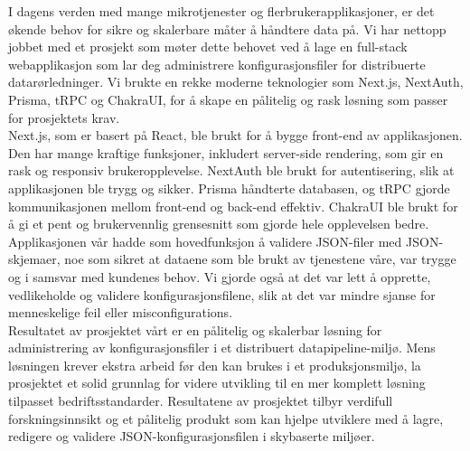 
\noindent
I dagens verden med mange mikrotjenester og flerbrukerapplikasjoner, er det økende behov for sikre og skalerbare måter å håndtere data på. Vi har nettopp jobbet med et prosjekt som møter dette behovet ved å lage en full-stack webapplikasjon som lar deg administrere konfigurasjonsfiler for distribuerte datarørledninger. Vi brukte en rekke moderne teknologier som Next.js, NextAuth, Prisma, tRPC og ChakraUI, for å skape en pålitelig og rask løsning som passer for prosjektets krav. \\

\noindent
Next.js, som er basert på React, ble brukt for å bygge front-end av applikasjonen. Den har mange kraftige funksjoner, inkludert server-side rendering, som gir en rask og responsiv brukeropplevelse. NextAuth ble brukt for autentisering, slik at applikasjonen ble trygg og sikker. Prisma håndterte databasen, og tRPC gjorde kommunikasjonen mellom front-end og back-end effektiv. ChakraUI ble brukt for å gi et pent og brukervennlig grensesnitt som gjorde hele opplevelsen bedre. \\

\noindent
Applikasjonen vår hadde som hovedfunksjon å validere JSON-filer med JSON-skjemaer, noe som sikret at dataene som ble brukt av tjenestene våre, var trygge og i samsvar med kundenes behov. Vi gjorde også at det var lett å opprette, vedlikeholde og validere konfigurasjonsfilene, slik at det var mindre sjanse for menneskelige feil eller misconfigurations. \\

\noindent
Resultatet av prosjektet vårt er en pålitelig og skalerbar løsning for administrering av konfigurasjonsfiler i et distribuert datapipeline-miljø. Mens løsningen krever ekstra arbeid før den kan brukes i et produksjonsmiljø, la prosjektet et solid grunnlag for videre utvikling til en mer komplett løsning tilpasset bedriftsstandarder. Resultatene av prosjektet tilbyr verdifull forskningsinnsikt og et pålitelig produkt som kan hjelpe utviklere med å lagre, redigere og validere JSON-konfigurasjonsfilen i skybaserte miljøer. \\